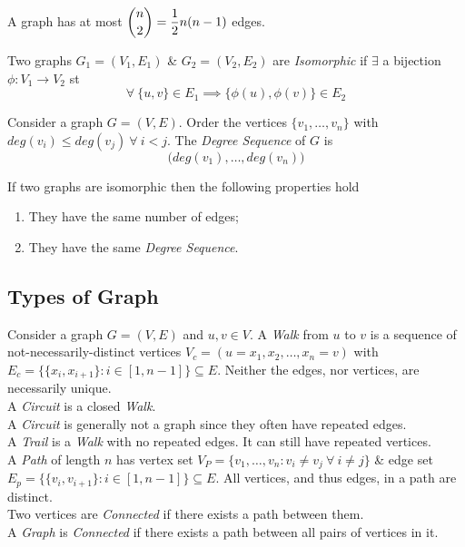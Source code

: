 \documentclass[11pt,a4paper]{article}
\begin{document}
A graph has at most $\displaystyle{{{n}\choose{2}}}=\frac{1}{2}n(n-1)$ edges.

Two graphs $G_1=(V_1,E_1)$ \& $G_2=(V_2,E_2)$ are \textit{Isomorphic} if $\exists$ a bijection $\phi:V_1\to V_2$ st
$$\forall\ \{u,v\}\in E_1\implies \{\phi(u),\phi(v)\}\in E_2$$

Consider a graph $G=(V,E)$. Order the vertices $\{v_1,\dots,v_n\}$ with $deg(v_i)\leq deg(v_j)\ \forall\ i<j$. The \textit{Degree Sequence} of $G$ is
$$\big(deg(v_1),\dots,deg(v_n)\big)$$

If two graphs are isomorphic then the following properties hold
\begin{enumerate}
	\item They have the same number of edges;
	\item They have the same \textit{Degree Sequence}.
\end{enumerate}

\subsection{Types of Graph}

Consider a graph $G=(V,E)$ and $u,v\in V$. A \textit{Walk} from $u$ to $v$ is a sequence of not-necessarily-distinct vertices $V_c=(u=x_1,x_2,\dots,x_n=v)$ with $E_c=\big\{\{x_i,x_{i+1}\}:i\in[1,n-1]\big\}\subseteq E$. Neither the edges, nor vertices, are necessarily unique.\\

A \textit{Circuit} is a closed \textit{Walk}.\\
\NB A \textit{Circuit} is generally not a graph since they often have repeated edges.\\

A \textit{Trail} is a \textit{Walk} with no repeated edges. It can still have repeated vertices.\\

A \textit{Path} of length $n$ has vertex set $V_P=\{v_1,\dots,v_n:v_i\neq v_j\ \forall\ i\neq j\}$ \& edge set $E_p=\{\{v_i,v_{i+1}\}:i\in[1,n-1]\}\subseteq E$. All vertices, and thus edges, in a path are distinct.\\

Two vertices are \textit{Connected} if there exists a path between them.\\
A \textit{Graph} is \textit{Connected} if there exists a path between all pairs of vertices in it.\\
\end{document}
